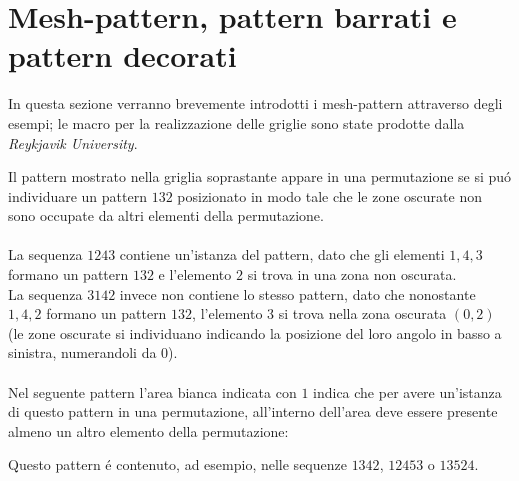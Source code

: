 \section*{Mesh-pattern, pattern barrati e pattern decorati}
In questa sezione verranno brevemente introdotti i mesh-pattern\cite{branden2011mesh} attraverso degli esempi; le macro per la realizzazione delle griglie sono state prodotte dalla \textit{Reykjavik University}\cite{patternmacros}.
\begin{center}
\end{center}
Il pattern mostrato nella griglia soprastante appare in una permutazione se si pu\'o individuare un pattern $132$ posizionato in modo tale che le zone oscurate non sono occupate da altri elementi della permutazione.\\\\
La sequenza $1243$ contiene un'istanza del pattern, dato che gli elementi $1,4,3$ formano un pattern $132$ e l'elemento $2$ si trova in una zona non oscurata.\\
La sequenza $3142$ invece non contiene lo stesso pattern, dato che nonostante $1,4,2$ formano un pattern $132$, l'elemento 3 si trova nella zona oscurata $(0,2)$ (le zone oscurate si individuano indicando la posizione del loro angolo in basso a sinistra, numerandoli da $0$).\\\\
Nel seguente pattern l'area bianca indicata con $1$ indica che per avere un'istanza di questo pattern in una permutazione, all'interno dell'area deve essere presente almeno un altro elemento della permutazione: 
\begin{center}
\end{center}
Questo pattern \'e contenuto, ad esempio, nelle sequenze $1342$, $12453$ o $13524$.